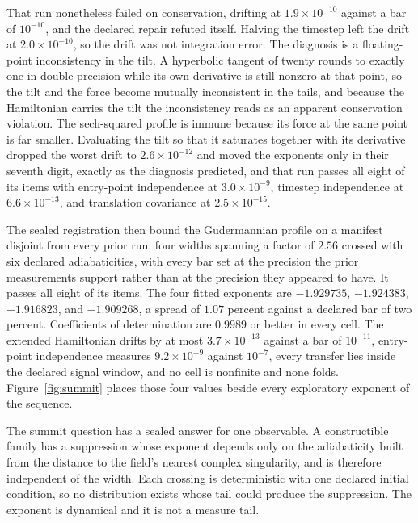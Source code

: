 \documentclass[aps,pre,reprint,nofootinbib,floatfix]{revtex4-2}
\begin{document}
That run nonetheless failed on conservation, drifting at
$1.9 \times 10^{-10}$ against a bar of $10^{-10}$, and the declared
repair refuted itself.  Halving the timestep left the drift at
$2.0 \times 10^{-10}$, so the drift was not integration error.  The
diagnosis is a floating-point inconsistency in the tilt.  A hyperbolic
tangent of twenty rounds to exactly one in double precision while its
own derivative is still nonzero at that point, so the tilt and the
force become mutually inconsistent in the tails, and because the
Hamiltonian carries the tilt the inconsistency reads as an apparent
conservation violation.  The sech-squared profile is immune because its
force at the same point is far smaller.  Evaluating the tilt so that it
saturates together with its derivative dropped the worst drift to
$2.6 \times 10^{-12}$ and moved the exponents only in their seventh
digit, exactly as the diagnosis predicted, and that run passes all
eight of its items with entry-point independence at
$3.0 \times 10^{-9}$, timestep independence at $6.6 \times 10^{-13}$,
and translation covariance at $2.5 \times 10^{-15}$.

The sealed registration then bound the Gudermannian profile on a
manifest disjoint from every prior run, four widths spanning a factor
of $2.56$ crossed with six declared adiabaticities, with every bar set
at the precision the prior measurements support rather than at the
precision they appeared to have.  It passes all eight of its items.
The four fitted
exponents are $-1.929735$, $-1.924383$, $-1.916823$, and $-1.909268$, a
spread of $1.07$ percent against a declared bar of two percent.
Coefficients of determination are $0.9989$ or better in every cell.
The extended Hamiltonian drifts by at most $3.7 \times 10^{-13}$
against a bar of $10^{-11}$, entry-point independence measures
$9.2 \times 10^{-9}$ against $10^{-7}$, every transfer lies inside the
declared signal window, and no cell is nonfinite and none folds.
Figure~\ref{fig:summit} places those four values beside every
exploratory exponent of the sequence.

The summit question has a sealed answer for one observable.  A
constructible family has a suppression whose exponent depends only on
the adiabaticity built from the distance to the field's nearest complex
singularity, and is therefore independent of the width.  Each crossing
is deterministic with one declared initial condition, so no
distribution exists whose tail could produce the suppression.  The
exponent is dynamical and it is not a measure tail.
\end{document}
